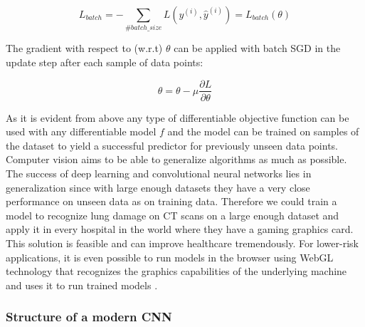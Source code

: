 \documentclass[a4paper,12pt]{article}
\begin{document}
\vspace{4mm}

\begin{equation}
    L_{batch} = - \sum_{\#batch\_size}L(y^{(i)}, \hat{y}^{(i)}) = L_{batch}(\theta)  
\end{equation}

\vspace{4mm}

\par The gradient with respect to (w.r.t) $\theta$ can be applied with batch SGD in the update step after each sample of data points:

\vspace{4mm}

\begin{equation}
    \theta = \theta - \mu \frac{\partial L}{\partial \theta}
\end{equation}

\vspace{4mm}

\par As it is evident from above any type of differentiable objective function can be used with any differentiable model $f$ and the model can be trained on samples of the dataset to yield a successful predictor for previously unseen data points. Computer vision aims to be able to generalize algorithms as much as possible. The success of deep learning and convolutional neural networks lies in generalization since with large enough datasets they have a very close performance on unseen data as on training data. Therefore we could train a model to recognize lung damage on CT scans on a large enough dataset and apply it in every hospital in the world where they have a gaming graphics card. This solution is feasible and can improve healthcare tremendously. For lower-risk applications, it is even possible to run models in the browser using WebGL technology that recognizes the graphics capabilities of the underlying machine and uses it to run trained models \cite{cohen2019chester}.

\vspace{4mm}

\subsubsection{Structure of a modern CNN}

\vspace{4mm}
\end{document}
